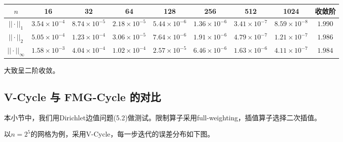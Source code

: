 \documentclass[lang=cn,10pt]{elegantbook}
\begin{document}
\begin{table}[H]
  \centering
  \small
  \begin{tabular}{c|ccccccc|c}
  \textbf{$n$}        & 16                   & 32                   & 64                   & 128                  & 256                  & 512                  & 1024                  & 收敛阶 \\ \hline
  $||\cdot||_1$      & $3.54\times 10^{-4}$ & $8.74\times 10^{-5}$ & $2.18\times 10^{-5}$ & $5.44\times 10^{-6}$ & $1.36\times 10^{-6}$ & $3.41\times 10^{-7}$ & $8.59\times 10^{-8}$ & $1.990$\\
  $||\cdot||_2$      & $5.05\times 10^{-4}$ & $1.23\times 10^{-4}$ & $3.06\times 10^{-5}$ & $7.64\times 10^{-6}$ & $1.91\times 10^{-6}$ & $4.79\times 10^{-7}$ & $1.21\times 10^{-7}$ & $1.986$\\
  $||\cdot||_\infty$ & $1.58\times 10^{-3}$ & $4.04\times 10^{-4}$ & $1.02\times 10^{-4}$ & $2.57\times 10^{-5}$ & $6.46\times 10^{-6}$ & $1.63\times 10^{-6}$ & $4.11\times 10^{-7}$ & $1.984$
  \end{tabular}
\end{table}

大致呈二阶收敛。

\subsection{V-Cycle 与 FMG-Cycle 的对比}

本小节中，我们用Dirichlet边值问题(5.2)做测试。限制算子采用full-weighting，插值算子选择二次插值。

以$n=2^5$的网格为例，采用V-Cycle，每一步迭代的误差分布如下图。
\end{document}
